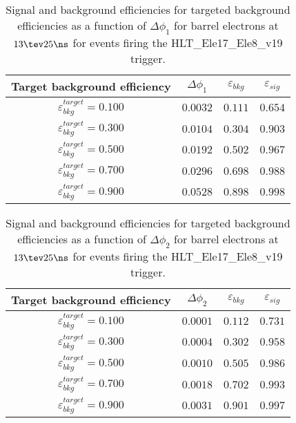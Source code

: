 \clearpage

\begin{table}[!bht]
  \begin{center}
    \begin{tabular}{cccc}
      \hline
      Target background efficiency & $\Delta\phi_1$ & $\varepsilon_{bkg}$ & $\varepsilon_{sig}$ \\ 
      \hline
      $\varepsilon_{bkg}^{target} = 0.100$ & $  0.0032$ & $0.111$ & $0.654$ \\
      $\varepsilon_{bkg}^{target} = 0.300$ & $  0.0104$ & $0.304$ & $0.903$ \\
      $\varepsilon_{bkg}^{target} = 0.500$ & $  0.0192$ & $0.502$ & $0.967$ \\
      $\varepsilon_{bkg}^{target} = 0.700$ & $  0.0296$ & $0.698$ & $0.988$ \\
      $\varepsilon_{bkg}^{target} = 0.900$ & $  0.0528$ & $0.898$ & $0.998$ \\
      \hline
    \end{tabular}
    \caption{Signal and background efficiencies for targeted background efficiencies as a function of $\Delta\phi_1$ for barrel electrons at $13\tev 25\ns$ for events firing the HLT\_Ele17\_Ele8\_v19 trigger.}
    \label{tab:eff_rej_phi1_beam_13_25_trigger_17_8_B}
  \end{center}
\end{table}

\clearpage

\begin{table}[!bht]
  \begin{center}
    \begin{tabular}{cccc}
      \hline
      Target background efficiency & $\Delta\phi_2$ & $\varepsilon_{bkg}$ & $\varepsilon_{sig}$ \\ 
      \hline
      $\varepsilon_{bkg}^{target} = 0.100$ & $  0.0001$ & $0.112$ & $0.731$ \\
      $\varepsilon_{bkg}^{target} = 0.300$ & $  0.0004$ & $0.302$ & $0.958$ \\
      $\varepsilon_{bkg}^{target} = 0.500$ & $  0.0010$ & $0.505$ & $0.986$ \\
      $\varepsilon_{bkg}^{target} = 0.700$ & $  0.0018$ & $0.702$ & $0.993$ \\
      $\varepsilon_{bkg}^{target} = 0.900$ & $  0.0031$ & $0.901$ & $0.997$ \\
      \hline
    \end{tabular}
    \caption{Signal and background efficiencies for targeted background efficiencies as a function of $\Delta\phi_2$ for barrel electrons at $13\tev 25\ns$ for events firing the HLT\_Ele17\_Ele8\_v19 trigger.}
    \label{tab:eff_rej_phi2_beam_13_25_trigger_17_8_B}
  \end{center}
\end{table}


